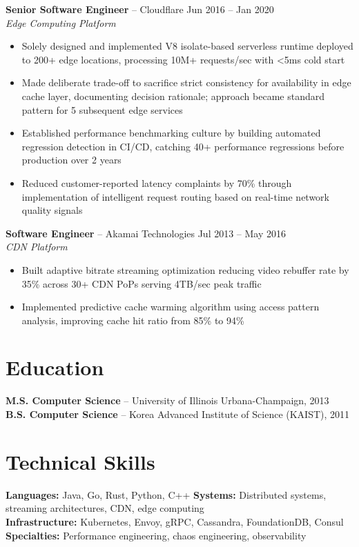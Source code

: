 \documentclass[10pt,letterpaper]{article}
\begin{document}
\textbf{Senior Software Engineer} -- Cloudflare \hfill {\small Jun 2016 -- Jan 2020}\\
{\footnotesize\color{accent}\itshape Edge Computing Platform}
\begin{itemize}
    \item Solely designed and implemented V8 isolate-based serverless runtime deployed to 200+ edge locations, processing 10M+ requests/sec with <5ms cold start
    \item Made deliberate trade-off to sacrifice strict consistency for availability in edge cache layer, documenting decision rationale; approach became standard pattern for 5 subsequent edge services
    \item Established performance benchmarking culture by building automated regression detection in CI/CD, catching 40+ performance regressions before production over 2 years
    \item Reduced customer-reported latency complaints by 70\% through implementation of intelligent request routing based on real-time network quality signals
\end{itemize}

\textbf{Software Engineer} -- Akamai Technologies \hfill {\small Jul 2013 -- May 2016}\\
{\footnotesize\color{accent}\itshape CDN Platform}
\begin{itemize}
    \item Built adaptive bitrate streaming optimization reducing video rebuffer rate by 35\% across 30+ CDN PoPs serving 4TB/sec peak traffic
    \item Implemented predictive cache warming algorithm using access pattern analysis, improving cache hit ratio from 85\% to 94\%
\end{itemize}

\section{Education}

\textbf{M.S. Computer Science} -- University of Illinois Urbana-Champaign, 2013\\
\textbf{B.S. Computer Science} -- Korea Advanced Institute of Science (KAIST), 2011

\section{Technical Skills}

{\small\textbf{Languages:} Java, Go, Rust, Python, C++ \quad \textbf{Systems:} Distributed systems, streaming architectures, CDN, edge computing\\
\textbf{Infrastructure:} Kubernetes, Envoy, gRPC, Cassandra, FoundationDB, Consul \quad \textbf{Specialties:} Performance engineering, chaos engineering, observability}
\end{document}
